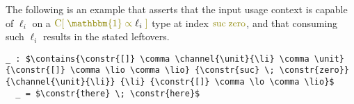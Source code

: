 \documentclass[a4paper,UKenglish,cleveref, autoref, thm-restate,authorcolumns]{lipics-v2019}
\theoremstyle{definition}
\newcommand{\type}[1]{\textcolor{blue}{\operatorname{#1}}}
\newcommand{\constr}[1]{\textcolor{olive}{\operatorname{#1}}}
\newcommand{\unit}{\constr{\mathbbm{1}}}
\newcommand{\channel}[2]{\constr{C[} \; #1 \; \constr{\propto} \; #2 \; \constr{]}}
\newcommand{\comma}{\; \constr{,} \;}
\newcommand{\li}{\ell_i}
\newcommand{\lo}{\ell_o}
\newcommand{\lio}{\ell_{\#}}
\newcommand{\contains}[6]{#1 \; \type{\propto} \; #2 \; \type{\ni}_{#3} \; #4 \; \type{\propto} \; #5 \; \type{\boxtimes} \; #6}
\begin{document}
\begin{example}
  The following is an example that asserts that the input usage context is capable of $\li$ on a $\channel{\unit}{\li}$ type at index $\constr{suc} \; \constr{zero}$, and that consuming such $\li$ results in the stated leftovers.
  \begin{lstlisting}[mathescape,caption=Here \_ introduces an anonymous declaration that must be immediately followed by its definition.]
  _ : $\contains{\constr{[]} \comma \channel{\unit}{\li} \comma \unit} {\constr{[]} \comma \lio \comma \lio} {\constr{suc} \; \constr{zero}} {\channel{\unit}{\li}} {\li} {\constr{[]} \comma \lo \comma \lio}$
  _ = $\constr{there} \; \constr{here}$
  \end{lstlisting}
\end{example}
\end{document}
